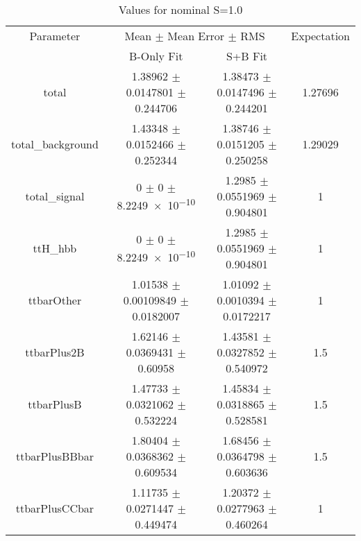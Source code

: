 \begin{table}
\centering
\caption{Values for nominal S=1.0}
\begin{tabular}{cccc}
\toprule
Parameter & \multicolumn{2}{c}{Mean $\pm$ Mean Error $\pm$ RMS} & Expectation\\
 & B-Only Fit & S+B Fit & \\
\midrule
total & \num{1.38962} $\pm$ \num{0.0147801} $\pm$ \num{0.244706} & \num{1.38473} $\pm$ \num{0.0147496} $\pm$ \num{0.244201} & \num{1.27696}\\
total\_background & \num{1.43348} $\pm$ \num{0.0152466} $\pm$ \num{0.252344} & \num{1.38746} $\pm$ \num{0.0151205} $\pm$ \num{0.250258} & \num{1.29029}\\
total\_signal & \num{0} $\pm$ \num{0} $\pm$ \num{8.2249e-10} & \num{1.2985} $\pm$ \num{0.0551969} $\pm$ \num{0.904801} & \num{1}\\
ttH\_hbb & \num{0} $\pm$ \num{0} $\pm$ \num{8.2249e-10} & \num{1.2985} $\pm$ \num{0.0551969} $\pm$ \num{0.904801} & \num{1}\\
ttbarOther & \num{1.01538} $\pm$ \num{0.00109849} $\pm$ \num{0.0182007} & \num{1.01092} $\pm$ \num{0.0010394} $\pm$ \num{0.0172217} & \num{1}\\
ttbarPlus2B & \num{1.62146} $\pm$ \num{0.0369431} $\pm$ \num{0.60958} & \num{1.43581} $\pm$ \num{0.0327852} $\pm$ \num{0.540972} & \num{1.5}\\
ttbarPlusB & \num{1.47733} $\pm$ \num{0.0321062} $\pm$ \num{0.532224} & \num{1.45834} $\pm$ \num{0.0318865} $\pm$ \num{0.528581} & \num{1.5}\\
ttbarPlusBBbar & \num{1.80404} $\pm$ \num{0.0368362} $\pm$ \num{0.609534} & \num{1.68456} $\pm$ \num{0.0364798} $\pm$ \num{0.603636} & \num{1.5}\\
ttbarPlusCCbar & \num{1.11735} $\pm$ \num{0.0271447} $\pm$ \num{0.449474} & \num{1.20372} $\pm$ \num{0.0277963} $\pm$ \num{0.460264} & \num{1}\\
\bottomrule
\end{tabular}
\end{table}